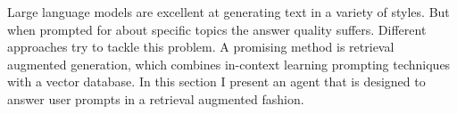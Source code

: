 \documentclass[../../main.tex]{subfiles}
\begin{document}
Large language models are excellent at generating text in a variety of styles.
But when prompted for about specific topics the answer quality suffers.
Different approaches try to tackle this problem.
A promising method is retrieval augmented generation, which combines in-context learning prompting techniques with a vector database.
In this section I present an agent that is designed to answer user prompts in a retrieval augmented fashion.
\end{document}
